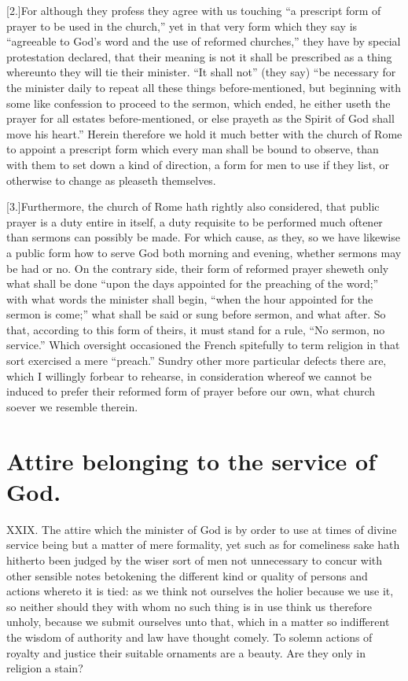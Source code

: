 [2.]For although they profess they agree with us touching “a prescript form of prayer to be used in the church,” yet in that very form which they say is “agreeable to God’s word and the use of reformed churches,” they have by special protestation declared, that their meaning is not it shall be prescribed as a thing whereunto they will tie their minister. “It shall not” (they say) “be necessary for the minister daily to repeat all these things before-mentioned, but beginning with some like confession to proceed to the sermon, which ended, he either useth the prayer for all estates before-mentioned, or else prayeth as the Spirit of God shall move his heart.” Herein therefore we hold it much better with the church of Rome to appoint a prescript form which every  man shall be bound to observe, than with them to set down a kind of direction, a form for men to use if they list, or otherwise to change as pleaseth themselves.

[3.]Furthermore, the church of Rome hath rightly also considered, that public prayer is a duty entire in itself, a duty requisite to be performed much oftener than sermons can possibly be made. For which cause, as they, so we have likewise a public form how to serve God both morning and evening, whether sermons may be had or no. On the contrary side, their form of reformed prayer sheweth only what shall be done “upon the days appointed for the preaching of the word;” with what words the minister shall begin, “when the hour appointed for the sermon is come;” what shall be said or sung before sermon, and what after. So that, according to this form of theirs, it must stand for a rule, “No sermon, no service.” Which oversight occasioned the French spitefully to term religion in that sort exercised a mere “preach.” Sundry other more particular defects there are, which I willingly forbear to rehearse, in consideration whereof we cannot be induced to prefer their reformed form of prayer before our own, what church soever we resemble therein.


\section*{Attire belonging to the service of God.}
XXIX. The attire which the minister of God is by order to use at times of divine service being but a matter of mere formality, yet such as for comeliness sake hath hitherto been judged by the wiser sort of men not unnecessary to concur with other sensible notes betokening the different kind or quality of persons and actions whereto it is tied: as we think not ourselves the holier because we use it, so neither should they with whom no such thing is in use think us therefore unholy, because we submit ourselves unto that, which in a matter so  indifferent the wisdom of authority and law have thought comely.
 To solemn actions of royalty and justice their suitable ornaments are a beauty. Are they only in religion a stain?

